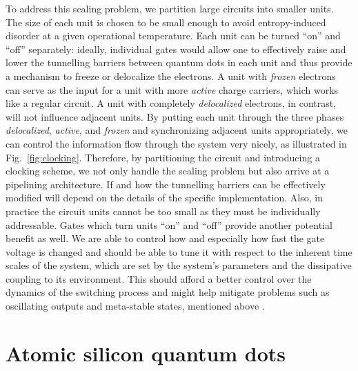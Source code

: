 To address this scaling problem, we partition large circuits into smaller units.
The size of each unit is chosen to be small enough to avoid entropy-induced
disorder at a given operational temperature. Each unit can be turned ``on'' and
``off'' separately: ideally, individual gates would allow one to effectively
raise and lower the tunnelling barriers between quantum dots in each unit and
thus provide a mechanism to freeze or delocalize the electrons. A unit with
\emph{frozen} electrons can serve as the input for a unit with more
\emph{active} charge carriers, which works like a regular  circuit. A
unit with completely \emph{delocalized} electrons, in contrast, will not
influence adjacent units. By putting each unit through the three phases
\emph{delocalized}, \emph{active}, and \emph{frozen} and synchronizing adjacent
units appropriately, we can control the information flow through the system very
nicely, as illustrated in Fig.~\ref{fig:clocking}. Therefore, by partitioning
the circuit and introducing a clocking scheme, we not only handle the scaling
problem but also arrive at a pipelining architecture. If and how the tunnelling
barriers can be effectively modified will depend on the details of the specific
 implementation. Also, in practice the  circuit units cannot
be too small as they must be individually addressable. Gates which turn
 units ``on'' and ``off'' provide another potential benefit as well.
We are able to control how and especially how fast the gate voltage is changed
and should be able to tune it with respect to the inherent time scales of the
 system, which are set by the system's parameters and the dissipative
coupling to its environment. This should afford a better control over the
dynamics of the switching process and might help mitigate problems such as
oscillating outputs and meta-stable states, mentioned above
\cite{lent1997device}.


\section{\label{sec:atomic_silicon_quantum_dots}Atomic silicon quantum dots}


